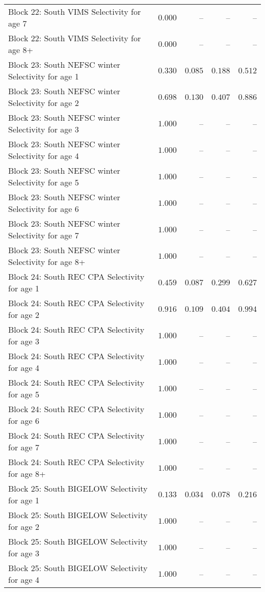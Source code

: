 \documentclass[
]{article}
\begin{document}
\begin{landscape}
\begin{longtable}[t]{lrrrr}
Block 22: South VIMS Selectivity for age 7 & $0.000$ & -- & -- & --\\
Block 22: South VIMS Selectivity for age 8+ & $0.000$ & -- & -- & --\\
Block 23: South NEFSC winter Selectivity for age 1 & $0.330$ & $0.085$ & $0.188$ & $0.512$\\
\addlinespace
Block 23: South NEFSC winter Selectivity for age 2 & $0.698$ & $0.130$ & $0.407$ & $0.886$\\
Block 23: South NEFSC winter Selectivity for age 3 & $1.000$ & -- & -- & --\\
Block 23: South NEFSC winter Selectivity for age 4 & $1.000$ & -- & -- & --\\
Block 23: South NEFSC winter Selectivity for age 5 & $1.000$ & -- & -- & --\\
Block 23: South NEFSC winter Selectivity for age 6 & $1.000$ & -- & -- & --\\
\addlinespace
Block 23: South NEFSC winter Selectivity for age 7 & $1.000$ & -- & -- & --\\
Block 23: South NEFSC winter Selectivity for age 8+ & $1.000$ & -- & -- & --\\
Block 24: South REC CPA Selectivity for age 1 & $0.459$ & $0.087$ & $0.299$ & $0.627$\\
Block 24: South REC CPA Selectivity for age 2 & $0.916$ & $0.109$ & $0.404$ & $0.994$\\
Block 24: South REC CPA Selectivity for age 3 & $1.000$ & -- & -- & --\\
\addlinespace
Block 24: South REC CPA Selectivity for age 4 & $1.000$ & -- & -- & --\\
Block 24: South REC CPA Selectivity for age 5 & $1.000$ & -- & -- & --\\
Block 24: South REC CPA Selectivity for age 6 & $1.000$ & -- & -- & --\\
Block 24: South REC CPA Selectivity for age 7 & $1.000$ & -- & -- & --\\
Block 24: South REC CPA Selectivity for age 8+ & $1.000$ & -- & -- & --\\
\addlinespace
Block 25: South BIGELOW Selectivity for age 1 & $0.133$ & $0.034$ & $0.078$ & $0.216$\\
Block 25: South BIGELOW Selectivity for age 2 & $1.000$ & -- & -- & --\\
Block 25: South BIGELOW Selectivity for age 3 & $1.000$ & -- & -- & --\\
Block 25: South BIGELOW Selectivity for age 4 & $1.000$ & -- & -- & --\\

\end{longtable}
\end{landscape}
\end{document}
